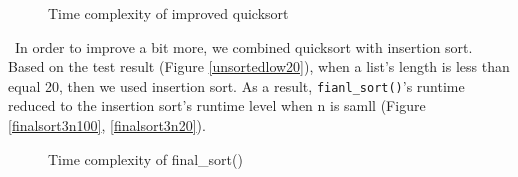 \documentclass[12pt]{article}
\begin{document}
\begin{figure}[hbt!]
  \centering
  \hfill
  \caption{Time complexity of improved quicksort}
\end{figure}

~\newline\noindent In order to improve a bit more, we combined quicksort with 
insertion sort. Based on the test result (Figure \ref{unsortedlow20}),
 when a list's length is less than equal 20, then we used insertion sort.
 As a result, \verb|fianl_sort()|'s runtime reduced to the insertion sort's runtime
 level when n is samll (Figure \ref{finalsort3n100}, \ref{finalsort3n20}).


 \begin{figure}[hbt!]
  \centering
  \hfill
  \caption{Time complexity of final\_sort()}
\end{figure}
\end{document}
